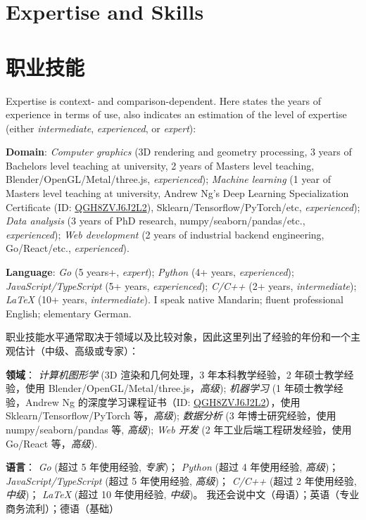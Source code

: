  {
  \section{\textbf{Expertise and Skills}}
}{
  \section{\textbf{职业技能}}
}
 {
  \small
  Expertise is context- and comparison-dependent. Here states the years of experience in terms of use, also indicates an estimation of the level of expertise (either \emph{intermediate}, \emph{experienced}, or \emph{expert}):
  \resumeSubHeadingListStart
  \item{\textbf{Domain}:
  \emph{Computer graphics} (3D rendering and geometry processing, 3 years of Bachelors level teaching at university, 2 years of Masters level teaching, Blender/OpenGL/Metal/three.js, \emph{experienced});
  \emph{Machine learning} (1 year of Masters level teaching at university, Andrew Ng's Deep Learning Specialization Certificate (ID: \href{https://www.coursera.org/account/accomplishments/specialization/QGH8ZVJ6J2L2}{QGH8ZVJ6J2L2}), Sklearn/Tensorflow/PyTorch/etc, \emph{experienced});
  \emph{Data analysis} (3 years of PhD research, numpy/seaborn/pandas/etc., \emph{experienced});
  \emph{Web development} (2 years of industrial backend engineering, Go/React/etc., \emph{experienced}).
  }
  \item{\textbf{Language}:
  \emph{Go} (5 years+, \emph{expert});
  \emph{Python} (4+ years, \emph{experienced});
  \emph{JavaScript/TypeScript} (5+ years, \emph{experienced});
  \emph{C/C++} (2+ years, \emph{intermediate});
  \emph{\LaTeX} (10+ years, \emph{intermediate}).
  I speak native Mandarin; fluent professional English; elementary German.
  }
  \resumeSubHeadingListEnd
}{
  \small
  职业技能水平通常取决于领域以及比较对象，因此这里列出了经验的年份和一个主观估计（中级、高级或专家）：
  \resumeSubHeadingListStart
  \item{\textbf{领域}：
  \emph{计算机图形学} (3D 渲染和几何处理，3 年本科教学经验，2 年硕士教学经验，使用 Blender/OpenGL/Metal/three.js，\emph{高级});
  \emph{机器学习} (1 年硕士教学经验，Andrew Ng 的深度学习课程证书（ID: \href{https://www.coursera.org/account/accomplishments/specialization/QGH8ZVJ6J2L2}{QGH8ZVJ6J2L2}），使用 Sklearn/Tensorflow/PyTorch 等，\emph{高级});
  \emph{数据分析} (3 年博士研究经验，使用 numpy/seaborn/pandas 等, \emph{高级});
  \emph{Web 开发} (2 年工业后端工程研发经验，使用 Go/React 等，\emph{高级}).
  }
  \item{\textbf{语言}：
  \emph{Go} (超过 5 年使用经验, \emph{专家})；
  \emph{Python} (超过 4 年使用经验, \emph{高级})；
  \emph{JavaScript/TypeScript} (超过 5 年使用经验, \emph{高级})；
  \emph{C/C++} (超过 2 年使用经验, \emph{中级})；
  \emph{\LaTeX} (超过 10 年使用经验, \emph{中级})。
  我还会说中文（母语）；英语（专业商务流利）；德语（基础）
  }
  \resumeSubHeadingListEnd
}